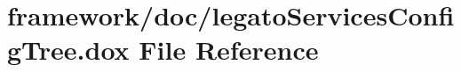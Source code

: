 \hypertarget{legato_services_config_tree_8dox}{}\section{framework/doc/legato\+Services\+Config\+Tree.dox File Reference}
\label{legato_services_config_tree_8dox}
